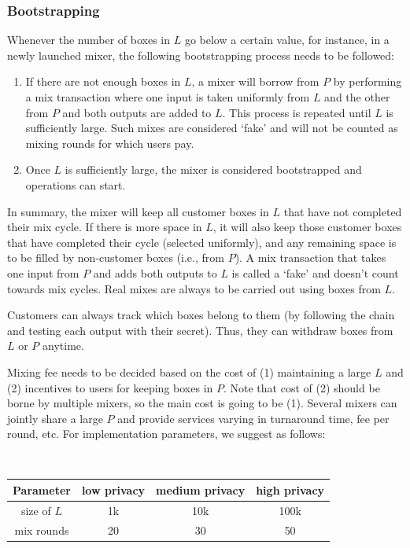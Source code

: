 \documentclass[runningheads]{llncs}
\begin{document}
\subsubsection{Bootstrapping}

Whenever the number of boxes in $L$ go below a certain value, for instance, in a newly launched mixer,
the following bootstrapping process needs to be followed:

\begin{enumerate}
\item If there are not enough boxes in $L$, a mixer will borrow from $P$ by performing a mix transaction where
one input is taken uniformly from $L$ and the other from $P$ and both outputs are added to $L$.
This process is repeated until $L$ is sufficiently large. Such mixes are considered `fake' and
will not be counted as mixing rounds for which users pay.

\item Once $L$ is sufficiently large, the mixer is considered bootstrapped and operations can start.
\end{enumerate}

In summary, the mixer will keep all customer boxes in $L$ that have not completed their mix cycle.
If there is more space in $L$, it will also keep those customer boxes that have completed their cycle (selected uniformly),
and any remaining space is to be filled by non-customer boxes (i.e., from $P$). A mix transaction that takes one input from $P$
and adds both outputs to $L$ is called a `fake' and doesn't count towards mix cycles. Real mixes are always to be carried out using boxes from $L$.

Customers can always track which boxes belong to them (by following the chain and testing each output with their secret).
Thus, they can withdraw boxes from $L$ or $P$  anytime.

Mixing fee needs to be decided based on the cost of (1) maintaining a large $L$ and (2) incentives to users for keeping boxes in $P$.
Note that cost of (2) should be borne by multiple mixers, so the main cost is going to be (1).
Several mixers can jointly share a large $P$ and provide services varying in turnaround time, fee per round, etc.
For implementation parameters, we suggest as follows:

~\\

\begin{tabular}
{|c|c|c|c|}\hline
Parameter & low privacy & medium privacy & high privacy  \\\hline
size of $L$ & 1k & 10k & 100k \\
mix rounds & 20 & 30 & 50 \\\hline
\end{tabular}
\end{document}
